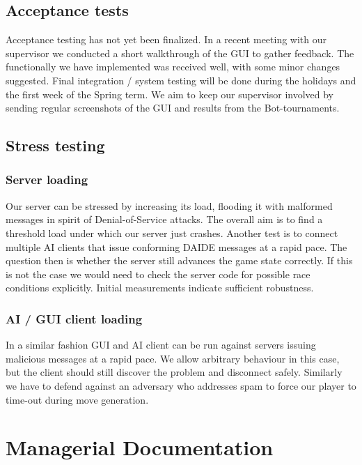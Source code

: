 \documentclass[pdftex,11pt,a4paper]{report}
\begin{document}
\subsection{Acceptance tests}
Acceptance testing has not yet been finalized. In a recent meeting
with our supervisor we conducted a short walkthrough of the GUI to
gather feedback. The functionally we have implemented was received
well, with some minor changes suggested. Final integration / system
testing will be done during the holidays and the first week of the
Spring term. We aim to keep our supervisor involved by sending regular
screenshots of the GUI and results from the Bot-tournaments.

\subsection{Stress testing}

\subsubsection{Server loading}

Our server can be stressed by increasing its load, flooding it with
malformed messages in spirit of Denial-of-Service attacks. The overall
aim is to find a threshold load under which our server just
crashes. Another test is to connect multiple AI clients that issue
conforming DAIDE messages at a rapid pace. The question then is
whether the server still advances the game state correctly. If this is
not the case we would need to check the server code for possible race
conditions explicitly. Initial measurements indicate sufficient
robustness.

\subsubsection{AI / GUI client loading}

In a similar fashion GUI and AI client can be run against servers
issuing malicious messages at a rapid pace. We allow arbitrary
behaviour in this case, but the client should still discover the
problem and disconnect safely. Similarly we have to defend against an
adversary who addresses spam to force our player to time-out during
move generation.


\section{Managerial Documentation}
\end{document}
